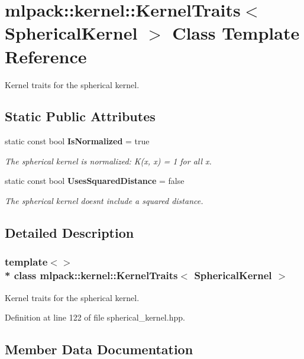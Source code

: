 \section{mlpack\+:\+:kernel\+:\+:Kernel\+Traits$<$ Spherical\+Kernel $>$ Class Template Reference}
\label{classmlpack_1_1kernel_1_1KernelTraits_3_01SphericalKernel_01_4}


Kernel traits for the spherical kernel.  


\subsection*{Static Public Attributes}
\begin{DoxyCompactItemize}
\item 
static const bool {\bf Is\+Normalized} = true
\begin{DoxyCompactList}\small\item\em The spherical kernel is normalized\+: K(x, x) = 1 for all x. \end{DoxyCompactList}\item 
static const bool {\bf Uses\+Squared\+Distance} = false
\begin{DoxyCompactList}\small\item\em The spherical kernel doesn\textquotesingle{}t include a squared distance. \end{DoxyCompactList}\end{DoxyCompactItemize}


\subsection{Detailed Description}
\subsubsection*{template$<$$>$\\*
class mlpack\+::kernel\+::\+Kernel\+Traits$<$ Spherical\+Kernel $>$}

Kernel traits for the spherical kernel. 

Definition at line 122 of file spherical\+\_\+kernel.\+hpp.



\subsection{Member Data Documentation}
